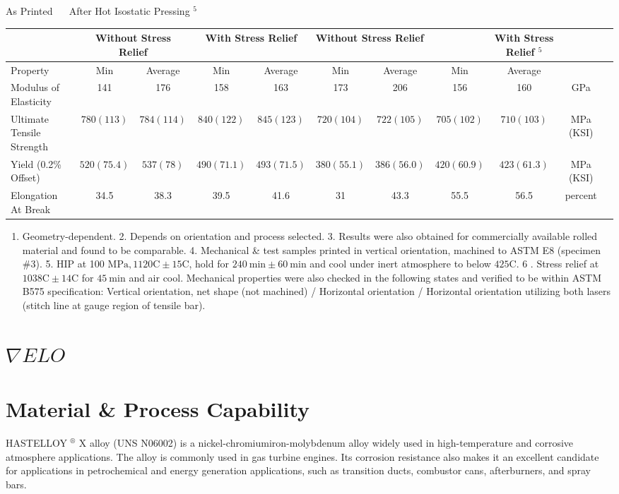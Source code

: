 \documentclass[10pt]{article}
\begin{document}
As Printed $\quad$ After Hot Isostatic Pressing ${ }^{5}$

\begin{center}
\begin{tabular}{lcccccccccc}
\hline
 & \multicolumn{2}{c}{Without Stress Relief} & \multicolumn{2}{c}{With Stress Relief} & \multicolumn{2}{l}{Without Stress Relief} &  & With Stress Relief $^{5}$ &  \\
\hline
Property & Min & Average & Min & Average & Min & Average & Min & Average &  \\
\hline
Modulus of Elasticity & 141 & 176 & 158 & 163 & 173 & 206 & 156 & 160 & GPa \\
\hline
Ultimate Tensile Strength & $780(113)$ & $784(114)$ & $840(122)$ & $845(123)$ & $720(104)$ & $722(105)$ & $705(102)$ & $710(103)$ & MPa (KSI) \\
\hline
Yield (0.2\% Offset) & $520(75.4)$ & $537(78)$ & $490(71.1)$ & $493(71.5)$ & $380(55.1)$ & $386(56.0)$ & $420(60.9)$ & $423(61.3)$ & MPa (KSI) \\
\hline
Elongation At Break & 34.5 & 38.3 & 39.5 & 41.6 & 31 & 43.3 & 55.5 & 56.5 & percent \\
\hline
\end{tabular}
\end{center}

\begin{enumerate}
  \item Geometry-dependent. 2. Depends on orientation and process selected. 3. Results were also obtained for commercially available rolled material and found to be comparable. 4. Mechanical \& test samples printed in vertical orientation, machined to ASTM E8 (specimen \#3). 5. HIP at 100 $\mathrm{MPa}, 1120 \mathrm{C} \pm 15 \mathrm{C}$, hold for $240 \mathrm{~min} \pm 60 \mathrm{~min}$ and cool under inert atmosphere to below $425 \mathrm{C}$. 6 . Stress relief at $1038 \mathrm{C} \pm 14 \mathrm{C}$ for $45 \mathrm{~min}$ and air cool. Mechanical properties were also checked in the following states and verified to be within ASTM B575 specification: Vertical orientation, net shape (not machined) / Horizontal orientation / Horizontal orientation utilizing both lasers (stitch line at gauge region of tensile bar).
\end{enumerate}

\section*{$\nabla E L O$}
\section*{Material \& Process Capability}
HASTELLOY ${ }^{\circledR}$ X alloy (UNS N06002) is a nickel-chromiumiron-molybdenum alloy widely used in high-temperature and corrosive atmosphere applications. The alloy is commonly used in gas turbine engines. Its corrosion resistance also makes it an excellent candidate for applications in petrochemical and energy generation applications, such as transition ducts, combustor cans, afterburners, and spray bars.
\end{document}
